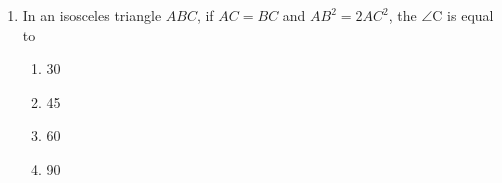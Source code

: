 \documentclass{article}
\begin{document}
\begin{enumerate}
\begin{enumerate}[label=(\roman*)]
        \item In an isosceles triangle $ABC$, if $AC=BC$ and $AB^2=2AC^2$, the $\angle$C is equal to
        \begin{enumerate}[label=(\Alph*)]
            \item 30\textdegree
            \item 45\textdegree
            \item 60\textdegree
            \item 90\textdegree
        \end{enumerate}
        \end{enumerate}
\end{enumerate}
\end{document}
